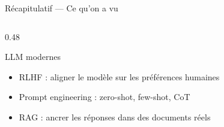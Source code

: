 \documentclass[aspectratio=169, 10pt]{beamer}
\begin{document}
\begin{frame}{Récapitulatif --- Ce qu'on a vu}
\begin{columns}[T]
\begin{column}{0.48\textwidth}
      \vspace{4pt}
      \begin{block}{LLM modernes}
        \begin{itemize}\small
          \item RLHF : aligner le modèle sur les préférences humaines
          \item Prompt engineering : zero-shot, few-shot, CoT
          \item RAG : ancrer les réponses dans des documents réels
        \end{itemize}
      \end{block}
    \end{column}
  \end{columns}
\end{frame}
\end{document}
